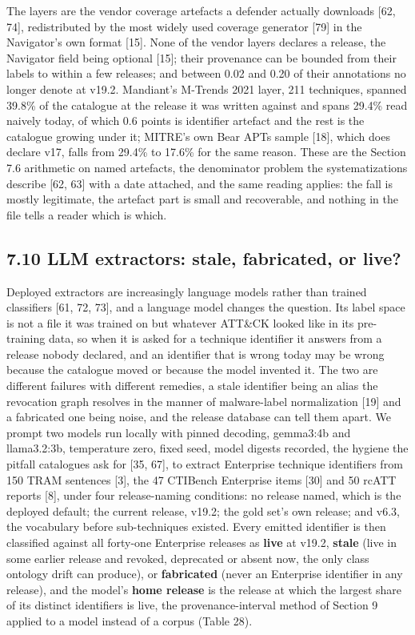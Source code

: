 \documentclass[11pt,a4paper]{article}
\begin{document}
The layers are the vendor coverage artefacts a defender actually downloads [62, 74], redistributed by the most widely used coverage generator [79] in the Navigator's own format [15]. None of the vendor layers declares a release, the Navigator field being optional [15]; their provenance can be bounded from their labels to within a few releases; and between 0.02 and 0.20 of their annotations no longer denote at v19.2. Mandiant's M-Trends 2021 layer, 211 techniques, spanned 39.8\% of the catalogue at the release it was written against and spans 29.4\% read naively today, of which 0.6 points is identifier artefact and the rest is the catalogue growing under it; MITRE's own Bear APTs sample [18], which does declare v17, falls from 29.4\% to 17.6\% for the same reason. These are the Section 7.6 arithmetic on named artefacts, the denominator problem the systematizations describe [62, 63] with a date attached, and the same reading applies: the fall is mostly legitimate, the artefact part is small and recoverable, and nothing in the file tells a reader which is which.

\subsection{7.10 LLM extractors: stale, fabricated, or live?}

Deployed extractors are increasingly language models rather than trained classifiers [61, 72, 73], and a language model changes the question. Its label space is not a file it was trained on but whatever ATT\&CK looked like in its pre-training data, so when it is asked for a technique identifier it answers from a release nobody declared, and an identifier that is wrong today may be wrong because the catalogue moved or because the model invented it. The two are different failures with different remedies, a stale identifier being an alias the revocation graph resolves in the manner of malware-label normalization [19] and a fabricated one being noise, and the release database can tell them apart. We prompt two models run locally with pinned decoding, gemma3:4b and llama3.2:3b, temperature zero, fixed seed, model digests recorded, the hygiene the pitfall catalogues ask for [35, 67], to extract Enterprise technique identifiers from 150 TRAM sentences [3], the 47 CTIBench Enterprise items [30] and 50 rcATT reports [8], under four release-naming conditions: no release named, which is the deployed default; the current release, v19.2; the gold set's own release; and v6.3, the vocabulary before sub-techniques existed. Every emitted identifier is then classified against all forty-one Enterprise releases as \textbf{live} at v19.2, \textbf{stale} (live in some earlier release and revoked, deprecated or absent now, the only class ontology drift can produce), or \textbf{fabricated} (never an Enterprise identifier in any release), and the model's \textbf{home release} is the release at which the largest share of its distinct identifiers is live, the provenance-interval method of Section 9 applied to a model instead of a corpus (Table 28).
\end{document}
